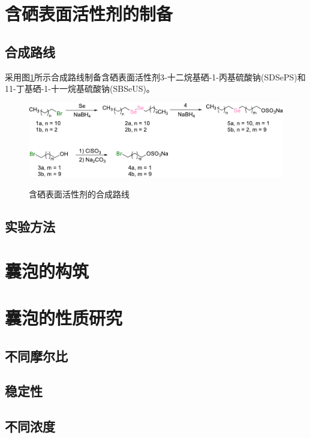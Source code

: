 \documentclass[bachelor,fandolfonts,replaceperiod]{jnuthesis} %
\begin{document}
    \zhlipsum[1]
    
    \section{含硒表面活性剂的制备}
    \subsection{合成路线}
    采用图\ref{fig:synthesis}所示合成路线制备含硒表面活性剂3-十二烷基硒-1-丙基硫酸钠(SDSePS)和
    11-丁基硒-1-十一烷基硫酸钠(SBSeUS)。
    \begin{figure}[htbp]
        \centering
        \includegraphics[scale=0.9]{figure/synthesis3.pdf}\\
        \caption{含硒表面活性剂的合成路线}\label{fig:synthesis}
    \end{figure}
    \subsection{实验方法}
    \zhlipsum[1]
    
    \section{囊泡的构筑}
    \zhlipsum[1]
    
    \section{囊泡的性质研究}
    \subsection{不同摩尔比}
    
    \subsection{稳定性}
    
    \subsection{不同浓度}
    
\end{document}

